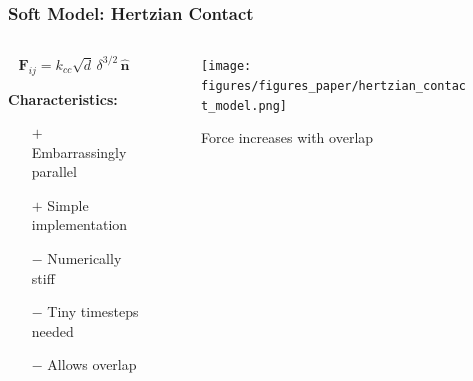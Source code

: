 \documentclass[10pt,t]{beamer}
\begin{document}
\begin{frame}
    \frametitle{Soft Model: Hertzian Contact}

    \vspace{0.7cm}

    \begin{columns}[c]
        \begin{column}{0.5\textwidth}
            \begin{equation*}
                \mathbf{F}_{ij} = k_{cc} \sqrt{d} \, \delta^{3/2} \, \hat{\mathbf{n}}
            \end{equation*}

            \vspace{0.3cm}

            \textbf{Characteristics:}
            \begin{itemize}
                \item[$+$] Embarrassingly parallel
                \item[$+$] Simple implementation
                \item[$-$] Numerically stiff
                \item[$-$] Tiny timesteps needed
                \item[$-$] Allows overlap
            \end{itemize}
        \end{column}

        \begin{column}{0.5\textwidth}
            \begin{figure}
                \centering
                \texttt{[image: figures/figures\_paper/hertzian\_contact\_model.png]}
                \caption*{\scriptsize{Force increases with overlap}}
            \end{figure}
        \end{column}
    \end{columns}

\end{frame}
\end{document}
